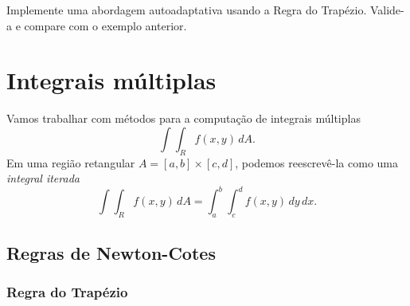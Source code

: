 \begin{exer}
  Implemente uma abordagem autoadaptativa usando a Regra do Trapézio. Valide-a e compare com o exemplo anterior.
\end{exer}

\section{Integrais múltiplas}\label{cap_integracao_sec_intmul}

Vamos trabalhar com métodos para a computação de integrais múltiplas
\begin{equation}
  \int\int_R f(x,y)\,dA.
\end{equation}
Em uma região retangular $A=[a,b]\times [c,d]$, podemos reescrevê-la como uma \emph{integral iterada}
\begin{equation}
  \int\int_R f(x,y)\,dA = \int_a^b\int_c^d f(x,y)\,dy\,dx.
\end{equation}

\subsection{Regras de Newton-Cotes}

\subsubsection{Regra do Trapézio}

